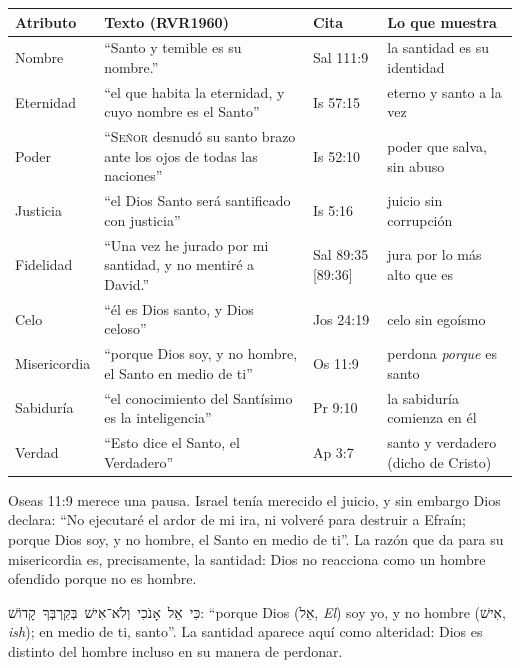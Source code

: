 \documentclass[11pt,letterpaper]{article}
\newcommand{\heb}[1]{\mbox{\foreignlanguage{hebrew}{#1}}}
\newcommand{\SENOR}{\textsc{Señor}}
\begin{document}
\begin{center}\small\renewcommand{\arraystretch}{1.25}
\begin{tabular}{@{}L{2.2cm}L{6.6cm}L{1.8cm}L{3.6cm}@{}}
\toprule
\textbf{Atributo} & \textbf{Texto (RVR1960)} & \textbf{Cita} & \textbf{Lo que muestra} \\ \midrule
Nombre & ``Santo y temible es su nombre.'' & Sal 111:9 & la santidad es su identidad \\
Eternidad & ``el que habita la eternidad, y cuyo nombre es el Santo'' & Is 57:15 & eterno y santo a la vez \\
Poder & ``\SENOR{} desnudó su santo brazo ante los ojos de todas las naciones'' & Is 52:10 & poder que salva, sin abuso \\
Justicia & ``el Dios Santo será santificado con justicia'' & Is 5:16 & juicio sin corrupción \\
Fidelidad & ``Una vez he jurado por mi santidad, y no mentiré a David.'' & Sal 89:35 [89:36] & jura por lo más alto que es \\
Celo & ``él es Dios santo, y Dios celoso'' & Jos 24:19 & celo sin egoísmo \\
Misericordia & ``porque Dios soy, y no hombre, el Santo en medio de ti'' & Os 11:9 & perdona \emph{porque} es santo \\
Sabiduría & ``el conocimiento del Santísimo es la inteligencia'' & Pr 9:10 & la sabiduría comienza en él \\
Verdad & ``Esto dice el Santo, el Verdadero'' & Ap 3:7 & santo y verdadero (dicho de Cristo) \\
\bottomrule
\end{tabular}\end{center}

Oseas 11:9 merece una pausa. Israel tenía merecido el juicio, y sin embargo Dios declara: ``No ejecutaré el ardor de mi ira, ni volveré para destruir a Efraín; porque Dios soy, y no hombre, el Santo en medio de ti''. La razón que da para su misericordia es, precisamente, la santidad: Dios no reacciona como un hombre ofendido porque no es hombre.

\begin{filologia}[Os 11:9]
\heb{כִּי אֵל אָנֹכִי וְלֹא־אִישׁ בְּקִרְבְּךָ קָדוֹשׁ}: ``porque Dios (\heb{אֵל}, \emph{El}) soy yo, y no hombre (\heb{אִישׁ}, \emph{ish}); en medio de ti, santo''. La santidad aparece aquí como alteridad: Dios es distinto del hombre incluso en su manera de perdonar.
\end{filologia}
\end{document}
